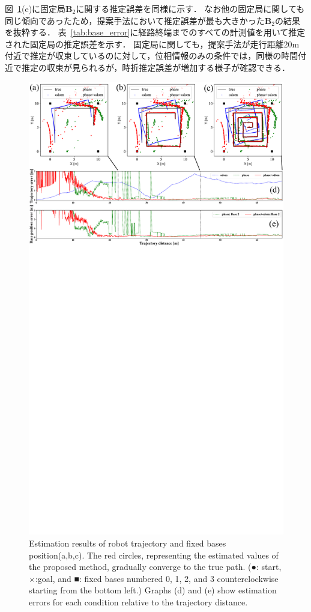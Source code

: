 \documentclass[a4jsme]{jsmepaper}
\newcommand\figref[1]{図~\ref{fig:#1}}
\newcommand\tabref[1]{表~\ref{tab:#1}}
\begin{document}
\figref{trajectory_sim}(e)に固定局$\mathbf{B}_2$に関する推定誤差を同様に示す．
なお他の固定局に関しても同じ傾向であったため，提案手法において推定誤差が最も大きかった$\mathbf{B}_2$の結果を抜粋する．
\tabref{base_error}に経路終端までのすべての計測値を用いて推定された固定局の推定誤差を示す．
固定局に関しても，提案手法が走行距離20m付近で推定が収束しているのに対して，位相情報のみの条件では，同様の時間付近で推定の収束が見られるが，時折推定誤差が増加する様子が確認できる．
\begin{figure}[t]
    \centering
    \includegraphics[width=0.95\linewidth]{figures/sim_graph.pdf}
    \caption{Estimation results of robot trajectory and fixed bases position(a,b,c). The red circles, representing the estimated values of the proposed method, gradually converge to the true path. (●: start, ×:goal, and ■: fixed bases numbered 0, 1, 2, and 3 counterclockwise starting from the bottom left.) Graphs (d) and (e) show estimation errors for each condition relative to the trajectory distance. }
    \label{fig:trajectory_sim}
\end{figure}
\end{document}
